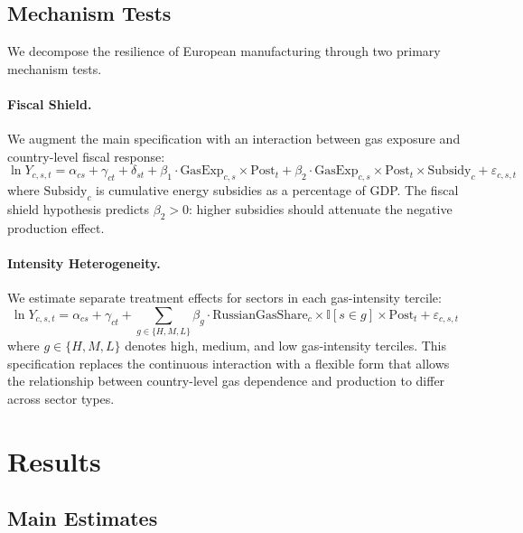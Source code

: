 \documentclass[12pt]{article}
\newcommand{\ind}{\mathbb{I}}
\begin{document}
\subsection{Mechanism Tests}

We decompose the resilience of European manufacturing through two primary mechanism tests.

\paragraph{Fiscal Shield.} We augment the main specification with an interaction between gas exposure and country-level fiscal response:
\begin{equation}
\ln Y_{c,s,t} = \alpha_{cs} + \gamma_{ct} + \delta_{st} + \beta_1 \cdot \text{GasExp}_{c,s} \times \text{Post}_t + \beta_2 \cdot \text{GasExp}_{c,s} \times \text{Post}_t \times \text{Subsidy}_c + \varepsilon_{c,s,t}
\label{eq:fiscal}
\end{equation}
where $\text{Subsidy}_c$ is cumulative energy subsidies as a percentage of GDP. The fiscal shield hypothesis predicts $\beta_2 > 0$: higher subsidies should attenuate the negative production effect.

\paragraph{Intensity Heterogeneity.} We estimate separate treatment effects for sectors in each gas-intensity tercile:
\begin{equation}
\ln Y_{c,s,t} = \alpha_{cs} + \gamma_{ct} + \sum_{g \in \{H, M, L\}} \beta_g \cdot \text{RussianGasShare}_c \times \ind[s \in g] \times \text{Post}_t + \varepsilon_{c,s,t}
\label{eq:het}
\end{equation}
where $g \in \{H, M, L\}$ denotes high, medium, and low gas-intensity terciles. This specification replaces the continuous interaction with a flexible form that allows the relationship between country-level gas dependence and production to differ across sector types.


\section{Results}
\label{sec:results}

\subsection{Main Estimates}
\end{document}
